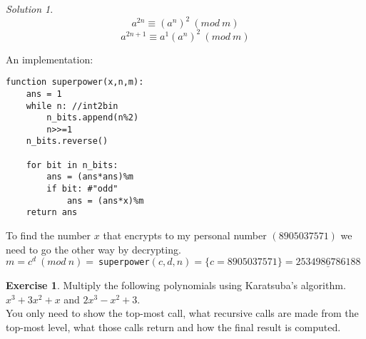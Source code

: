 \documentclass[a4paper,twoside=false,abstract=false,numbers=noenddot,
titlepage=false,headings=small,parskip=half,version=last]{scrartcl}
\theoremstyle{definition}
\newtheorem{exercise}{Exercise}
\theoremstyle{remark}
\newtheorem*{solution}{Solution}
\begin{document}
\begin{solution}
\begin{equation}
    a^{2n} \equiv (a^n)^2 \ ( mod \ m)
\end{equation}
\begin{equation}
    a^{2n+1} \equiv a^1(a^n)^2 \ ( mod \ m )
\end{equation}

An implementation:
\begin{verbatim}
function superpower(x,n,m):
    ans = 1
    while n: //int2bin
        n_bits.append(n%2)
        n>>=1
    n_bits.reverse()

    for bit in n_bits:
        ans = (ans*ans)%m 
        if bit: #"odd"
            ans = (ans*x)%m
    return ans
\end{verbatim}

To find the number $x$ that encrypts to my personal number $(8905037571)$ we
need to go the other way by decrypting. \\
$m=c^d \ (mod \ n) =\
$\verb+superpower+$(c,d,n)=\{c=8905037571\}=\underline{2534986786188}$

\end{solution}
\begin{exercise}
Multiply the following polynomials using Karatsuba's algorithm.\\
$x^3+3x^2+x$ and $2x^3-x^2+3$.\\
You only need to show the top-most call, what recursive calls are made from the
top-most level, what those calls return and how the final result is computed.

\end{exercise}
\end{document}
